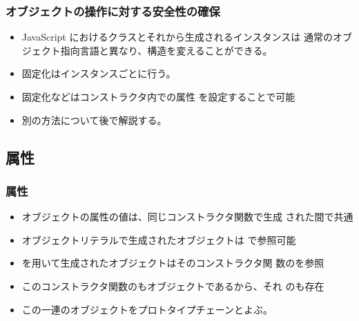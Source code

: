 \begin{frame}[containsverbatim]
 \frametitle{オブジェクトの操作に対する安全性の確保}
 \begin{itemize}
  \item JavaScript におけるクラスとそれから生成されるインスタンスは
 通常のオブジェクト指向言語と異なり、構造を変えることができる。
  \item  固定化はインスタンスごとに行う。
	\item 固定化などはコンストラクタ内での属性
				を設定することで可能
  \item 別の方法について後で解説する。
 \end{itemize}
\end{frame}
 \subsection{\protect{}属性}
 \begin{frame}[containsverbatim]
  \frametitle{属性}
  \begin{itemize}
   \item オブジェクトの属性の値は、同じコンストラクタ関数で生成
 された間で共通
   \item オブジェクトリテラルで生成されたオブジェクトは
         で参照可能
   \item {}を用いて生成されたオブジェクトはそのコンストラクタ関
         数のを参照
   \item このコンストラクタ関数のもオブジェクトであるから、それ
 のも存在
   \item この一連のオブジェクトをプロトタイプチェーンとよぶ。
  \end{itemize}
 \end{frame}
